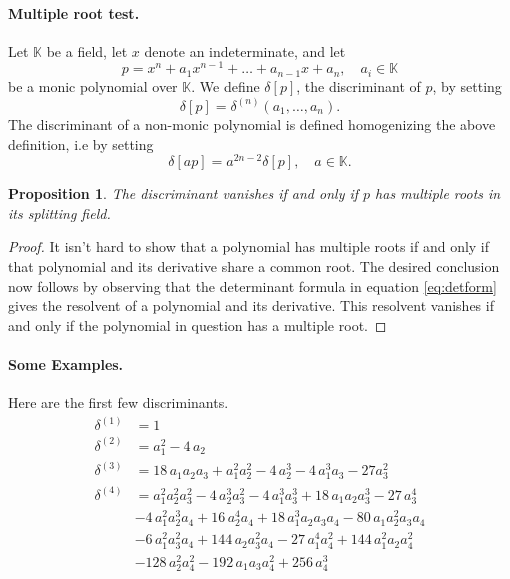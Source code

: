\documentclass[12pt]{article}
\newcommand{\dn}{\delta^{(n)}}
\newcommand{\kfield}{\mathbb{K}}
\newcommand{\fchar}{\mathrm{char}}
\newcommand{\lp}{\left(}
\newcommand{\rp}{\right)}
\newtheorem{proposition}{Proposition}
\begin{document}
\paragraph{Multiple root test.}  Let $\kfield$ be a field, let $x$ denote an
indeterminate, and let
\[
p = x^n + a_1 x^{n-1} + \ldots + a_{n-1} x + a_n,\quad
a_i\in\kfield
\]
be a monic polynomial over $\kfield$.  We define
$\delta[p]$, the discriminant of $p$, by setting
\[
\delta[p] = \dn\lp a_1,\ldots, a_n\rp.
\]
The discriminant of a non-monic polynomial is defined homogenizing the
above definition, i.e by setting
\[
\delta[a p] = a^{2n-2} \delta[p],\quad a\in\kfield.
\]


\begin{proposition}
  The discriminant vanishes if and only if $p$ has multiple roots in
  its splitting field.  
\end{proposition}
\begin{proof}
It isn't hard to show that a polynomial has multiple roots if and only
if that polynomial and its derivative share a common root.  The
desired conclusion now follows by observing that
the determinant formula in equation \eqref{eq:detform} gives the
resolvent of a polynomial and its derivative.  This resolvent vanishes
if and only if the polynomial in question has a multiple root.
\end{proof}

\paragraph{Some Examples.}
Here are the first few discriminants.
\begin{align*}
\delta^{(1)}  &=1\\
\delta^{(2)}  &=a_1^2 - 4\,  a_2\\
\delta^{(3)}  &=18\,  a_1 a_2 a_3 + a_1^2 a_2^2 - 4\,  a_2^3 - 4\,
a_1^3 a_3 - 27 a_3^2 \\
\delta^{(4)} &= 
a_1^2a_2^2a_3^2 - 4\,a_2^3a_3^2 - 4\,a_1^3a_3^3 + 
    18\,a_1a_2a_3^3 - 27\,a_3^4\\
& - 4\,a_1^2a_2^3a_4 +    16\,a_2^4a_4 + 
 18\,a_1^3a_2a_3a_4 - 
    80\,a_1a_2^2a_3a_4\\
& - 6\,a_1^2a_3^2a_4 +    144\,a_2a_3^2a_4   - 27\,a_1^4a_4^2 + 
    144\,a_1^2a_2a_4^2 \\
&- 128\,a_2^2a_4^2 - 
    192\,a_1a_3a_4^2 + 256\,a_4^3
\end{align*}
\end{document}

